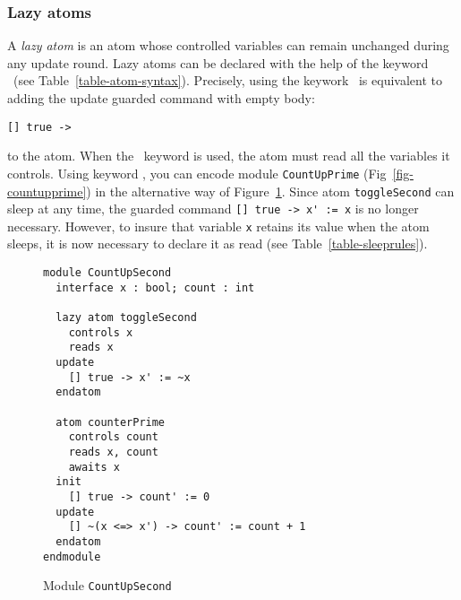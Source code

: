 {\subsubsection{Lazy atoms}
\label{sec-lazyatoms}
A {\em lazy atom\/} is an atom whose controlled variables can remain
unchanged during any update round.  Lazy atoms can be declared with
the help of the keyword \LAZY\ (see Table~\ref{table-atom-syntax}).
Precisely, using the keywork \LAZY\ is equivalent to adding the
update guarded command with empty body: 
%
\begin{verbatim}
[] true -> 
\end{verbatim}
%
to the atom.  When the \LAZY\ keyword is used, the atom must
read all the variables it controls.  Using
keyword \LAZY, you can encode module {\tt CountUpPrime}
(Fig~\ref{fig-countupprime}) in the alternative way of
Figure~\ref{fig-countupsecond}. 
Since atom {\tt toggleSecond} can sleep at any time, the guarded
command 
%
\verb#[] true -> x' := x#
%
is no longer necessary.  However, to insure that variable {\tt x}
retains its value when the atom sleeps, it is now necessary to declare
it as read (see Table~\ref{table-sleeprules}).

\begin{figure}
\begin{verbatim}
module CountUpSecond 
  interface x : bool; count : int

  lazy atom toggleSecond
    controls x
    reads x
  update 
    [] true -> x' := ~x 
  endatom

  atom counterPrime
    controls count
    reads x, count
    awaits x
  init
    [] true -> count' := 0
  update
    [] ~(x <=> x') -> count' := count + 1
  endatom
endmodule 
\end{verbatim}
\caption{Module {\tt CountUpSecond}}
\label{fig-countupsecond}
\end{figure}


\begin{comment}
\subsubsection{Event atoms}\index{atom!event}\index{event@\EVENT}

\begin{figure}
\begin{verbatim}
module ExampleEvent
  interface y, z : int
  external x : bool

  event atom sometimesUp
    controls y, z
    reads x, y, z
    awaits x
  update 
    [] ~(x = x') -> y' := y + 1 
    [] true      -> z' := z - 1 
  endatom 
endmodule
\end{verbatim}
\caption{Module {\tt ExampleEvent}}
\label{fig-exampleevent}
\end{figure}


\end{comment}}
